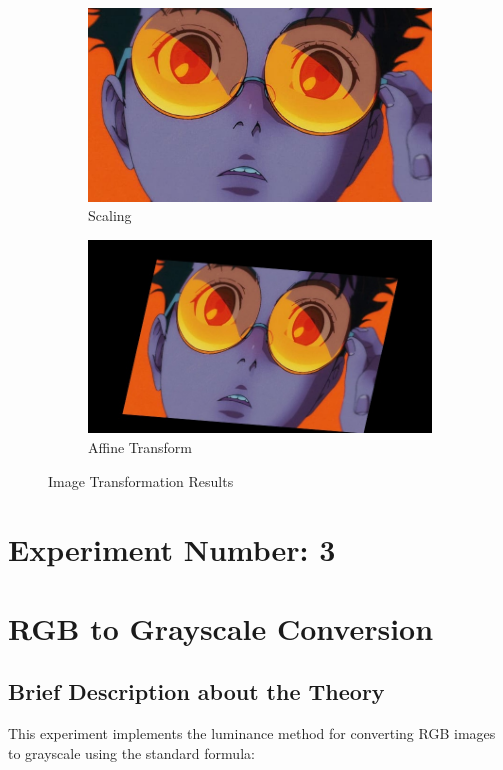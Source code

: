 \documentclass[12pt,a4paper]{article}
\begin{document}
\begin{figure}[H]
\begin{subfigure}[b]{0.45\textwidth}
    \includegraphics[width=\textwidth]{transformations/scaled.jpg}
    \caption{Scaling}
  \end{subfigure}
  \hfill
  \begin{subfigure}[b]{0.45\textwidth}
    \includegraphics[width=\textwidth]{transformations/affine.jpg}
    \caption{Affine Transform}
  \end{subfigure}
  \caption{Image Transformation Results}
  \label{fig:transformations}
\end{figure}

\newpage
\section*{Experiment Number: 3}
\section{RGB to Grayscale Conversion}

\subsection{Brief Description about the Theory}
This experiment implements the luminance method for converting RGB images to grayscale using the standard formula:
\end{document}
